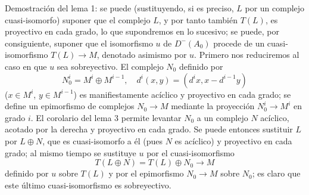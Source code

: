 Demostración del lema 1: se puede (sustituyendo, si es preciso, $L$ por un complejo cuasi-isomorfo) suponer que el complejo $L$, y por tanto también $T(L)$, es proyectivo en cada grado, lo que supondremos en lo sucesivo; se puede, por consiguiente, suponer que el isomorfismo $u$ de $D^-(A_0)$ procede de un cuasi-isomorfismo $T(L)\to M$, denotado asimismo por $u$. Primero nos reduciremos al caso en que $u$ sea sobreyectivo. El complejo $N_0$ definido por
\[
N_0^i=M^i\oplus M^{i-1},
\quad
 d^i(x,y)=(d^i x,x-d^{i-1}y)
\]
($x\in M^i$, $y\in M^{i-1}$) es manifiestamente acíclico y proyectivo en cada grado; se define un epimorfismo de complejos $N_0\to M$ mediante la proyección $N_0^i\to M^i$ en grado $i$. El corolario del lema 3 permite levantar $N_0$ a un complejo $N$ acíclico, acotado por la derecha y proyectivo en cada grado. Se puede entonces sustituir $L$ por $L\oplus N$, que es cuasi-isomorfo a él (pues $N$ es acíclico) y proyectivo en cada grado; al mismo tiempo se sustituye $u$ por el cuasi-isomorfismo
\[
T(L\oplus N)=T(L)\oplus N_0\longrightarrow M
\]
definido por $u$ sobre $T(L)$ y por el epimorfismo $N_0\to M$ sobre $N_0$; es claro que este último cuasi-isomorfismo es sobreyectivo.
